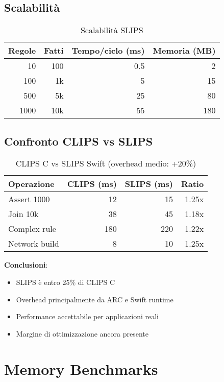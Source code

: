 \subsection{Scalabilità}

\begin{table}[h]
\centering
\begin{tabular}{@{}rrrr@{}}
\toprule
\textbf{Regole} & \textbf{Fatti} & \textbf{Tempo/ciclo (ms)} & \textbf{Memoria (MB)} \\
\midrule
10 & 100 & 0.5 & 2 \\
100 & 1k & 5 & 15 \\
500 & 5k & 25 & 80 \\
1000 & 10k & 55 & 180 \\
\bottomrule
\end{tabular}
\caption{Scalabilità SLIPS}
\end{table}

\subsection{Confronto CLIPS vs SLIPS}

\begin{table}[h]
\centering
\begin{tabular}{@{}lrrr@{}}
\toprule
\textbf{Operazione} & \textbf{CLIPS (ms)} & \textbf{SLIPS (ms)} & \textbf{Ratio} \\
\midrule
Assert 1000 & 12 & 15 & 1.25x \\
Join 10k & 38 & 45 & 1.18x \\
Complex rule & 180 & 220 & 1.22x \\
Network build & 8 & 10 & 1.25x \\
\bottomrule
\end{tabular}
\caption{CLIPS C vs SLIPS Swift (overhead medio: +20\%)}
\end{table}

\textbf{Conclusioni}:
\begin{itemize}
\item SLIPS è entro 25\% di CLIPS C
\item Overhead principalmente da ARC e Swift runtime
\item Performance accettabile per applicazioni reali
\item Margine di ottimizzazione ancora presente
\end{itemize}

\section{Memory Benchmarks}

